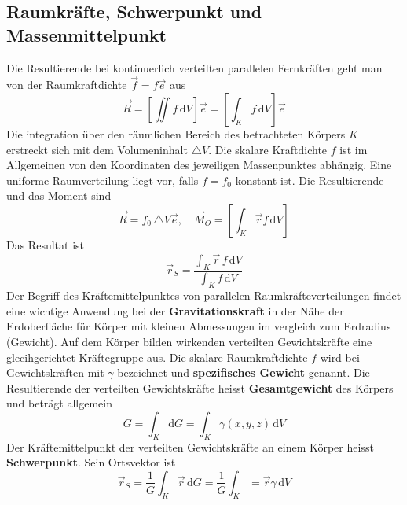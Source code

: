 \subsection{Raumkräfte, Schwerpunkt und Massenmittelpunkt}
Die Resultierende bei kontinuerlich verteilten parallelen Fernkräften geht man von der Raumkraftdichte $\overrightarrow{f}=f\overrightarrow{e}$ aus
\begin{equation}
\boxed{\overrightarrow{R}=\left[\displaystyle \iint f\,\text{d}V\right]\overrightarrow{e}=\left[\displaystyle \int_K f\,\text{d}V\right]\overrightarrow{e}}
\end{equation}
Die integration über den räumlichen Bereich des betrachteten Körpers $K$ erstreckt sich mit dem Volumeninhalt $\triangle V$. Die skalare Kraftdichte $f$ ist im Allgemeinen von den Koordinaten des jeweiligen Massenpunktes abhängig. Eine uniforme Raumverteilung liegt vor, falls $f=f_0$ konstant ist. Die Resultierende und das Moment sind 
\begin{equation}
\boxed{\overrightarrow{R}=f_0\,\triangle V \overrightarrow{e},\quad \overrightarrow{M}_O=\left[\displaystyle \int_K\overrightarrow{r}f\,\text{d}V\right]}
\end{equation}
Das Resultat ist
\begin{equation}
\boxed{\overrightarrow{r}_S=\dfrac{\displaystyle \int_K\overrightarrow{r}\,f\,\text{d}V}{\displaystyle \int_Kf\,\text{d}V}}
\end{equation}
Der Begriff des Kräftemittelpunktes von parallelen Raumkräfteverteilungen findet eine wichtige Anwendung bei der \textbf{Gravitationskraft} in der Nähe der Erdoberfläche für Körper mit kleinen Abmessungen im vergleich zum Erdradius (Gewicht). Auf dem Körper bilden wirkenden verteilten Gewichtskräfte eine glecihgerichtet Kräftegruppe aus.
\newline\newline
Die skalare Raumkraftdichte $f$ wird bei Gewichtskräften mit $\gamma$ bezeichnet und \textbf{spezifisches Gewicht} genannt. Die Resultierende der verteilten Gewichtskräfte heisst \textbf{Gesamtgewicht} des Körpers und beträgt allgemein
\begin{equation}
\boxed{G=\displaystyle \int_K\text{d}G=\displaystyle \int_K\gamma\left(x,y,z\right)\,\text{d}V}
\end{equation}
Der Kräftemittelpunkt der verteilten Gewichtskräfte an einem Körper heisst \textbf{Schwerpunkt}. Sein Ortsvektor ist
\begin{equation}
\boxed{\overrightarrow{r}_S=\dfrac{1}{G}\displaystyle \int_K\overrightarrow{r}\,\text{d}G=\dfrac{1}{G}\displaystyle \int_K=\overrightarrow{r}\gamma\,\text{d}V}
\end{equation}
